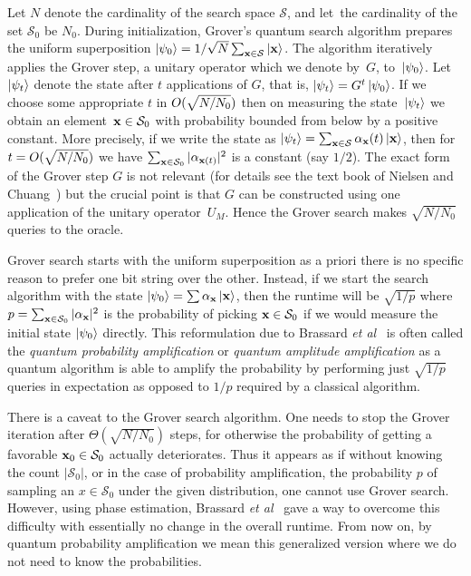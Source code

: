 \documentclass[a4paper,11pt]{article}
\begin{document}
Let $N$ denote the cardinality of the search space $\mathcal{S}$, and let~the cardinality of the set $\mathcal{S}_0$ be $N_0$. During initialization, Grover's quantum search algorithm prepares the uniform superposition $\ket{\psi_0}= {1}/{\sqrt{N}}\sum_{\xvec \in \mathcal{S}}\ket{\xvec}$. The algorithm iteratively applies the Grover step, a unitary operator which we denote by~$G$, to~$\left\vert \psi_0 \right\rangle$. Let~$\left\vert \psi_t \right\rangle$ denote the state after $t$ applications of $G$, that is, $\left\vert \psi_t \right\rangle = G^t \left\vert \psi_0 \right\rangle$. If we choose some appropriate $t$ in $ {O}(\sqrt{N/N_0})$ then on measuring the state~$\left\vert \psi_t \right\rangle$ we obtain an element~$\xvec \in \mathcal{S}_0$ with probability bounded from below by a positive constant. More precisely, if we write the state as $\ket{\psi_t} = \sum_{\xvec\in \mathcal{S}} \alpha_{\xvec}(t)\ket{\xvec}$, then for $t= {O}(\sqrt{N/N_0})$ we have $\sum_{\xvec\in\mathcal{S}_0} |\alpha_{\xvec(t)}|^2$ is a constant (say $1/2$). The exact form of the Grover step $G$ is not relevant (for details see the text book of Nielsen and Chuang~\cite[Chapter 6]{nielsenchuang:book}) but the crucial point is that $G$ can be constructed using one application of the unitary operator~$U_M$. Hence the Grover search makes $\sqrt{N/N_0}$ queries to the oracle.

Grover search starts with the uniform superposition as a priori there is no specific reason to prefer one bit string over the other. Instead, if we start the search algorithm with the state $\ket{\psi_0} = \sum \alpha_{\xvec} \ket{\xvec}$, then the runtime will be $\sqrt{1/p}$ where $p = \sum_{\xvec\in \mathcal{S}_0} |\alpha_{\xvec}|^2$ is the probability of picking $\xvec\in \mathcal{S}_0$ if we would measure the initial state $\left\vert \psi_0 \right\rangle$ directly. This reformulation due to Brassard \emph{et al}~\cite{brassard98quantum} is often called the \emph{quantum probability amplification} or \emph{quantum amplitude amplification} as a quantum algorithm is able to amplify the probability by performing just $\sqrt{1/p}$ queries in expectation as opposed to $1/p$ required by a classical algorithm.

There is a caveat to the Grover search algorithm. One needs to stop the Grover iteration after $\Theta(\sqrt{N/N_0})$ steps, for otherwise the probability of getting a favorable $\xvec_0 \in \mathcal{S}_0$ actually deteriorates. Thus it appears as if without knowing the count $|\mathcal{S}_0|$, or in the case of probability amplification, the probability $p$ of sampling an $x\in \mathcal{S}_0$ under the given distribution, one cannot use Grover search. However, using phase estimation, Brassard \emph{et al}~\cite{brassard98quantum} gave a way to overcome this difficulty with essentially no change in the overall runtime. {From} now on, by quantum probability amplification we mean this generalized version where we do not need to know the probabilities.
\end{document}
